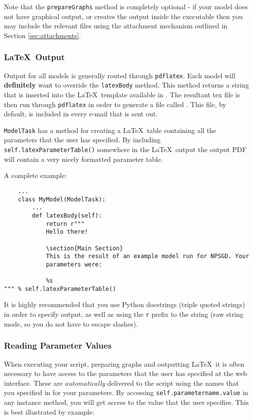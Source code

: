 \documentclass{article}
\newcommand{\mclass}[1]{\sloppy\texttt{#1}}
\begin{document}
Note that the \texttt{prepareGraphs} method is completely optional - if your
model does not have graphical output, or creates the output inside the
executable then you may include the relevant files using the attachment mechanism
outlined in Section \ref{sec:attachments}.


\subsubsection{\LaTeX\ Output}
\label{sec:LatexOutput}
Output for all models is generally routed through \texttt{pdflatex}. Each model will
\textbf{definitely} want to override the \texttt{latexBody} method. This method
returns a string that is inserted into the \LaTeX\ template available in
. The resultant tex file is then run through 
\texttt{pdflatex} in order to generate a file
called . This file, by default, is included in every e-mail
that is sent out.

\mclass{ModelTask} has a method for creating a \LaTeX\ table containing
all the parameters that the user has specified. By including
\texttt{self.latexParameterTable()} somewhere in the \LaTeX\ output the output
PDF will contain a very nicely formatted parameter table.

A complete example:
\begin{lstlisting}
    ...
    class MyModel(ModelTask):
        ...
        def latexBody(self):
            return r"""
            Hello there!

            \section{Main Section}
            This is the result of an example model run for NPSGD. Your
            parameters were:

            %s
""" % self.latexParameterTable()
\end{lstlisting}

It is highly recommended that you use Python docstrings (triple quoted strings)
in order to specify output, as well as using the \texttt{r} prefix to the string
(raw string mode, so you do not have to escape slashes).

\subsubsection{Reading Parameter Values}
When executing your script, preparing graphs and outputting \LaTeX\ it is often
necessary to have access to the parameters that the user has specified at the
web interface. These are \textit{automatically} delivered to the script using
the names that you specified in for your parameters. By accessing
\texttt{self.parametername.value} in any instance method, you will get access to
the value that the user specifies. This is best illustrated by example:
\end{document}
